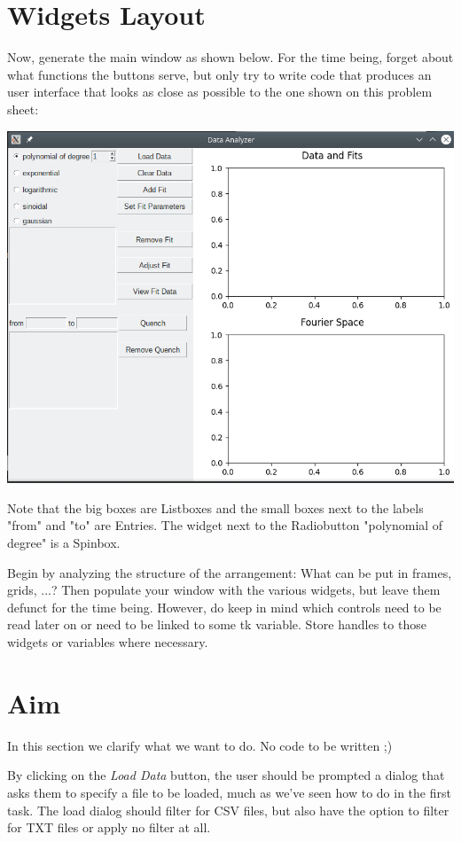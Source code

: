 \documentclass[
	english,
	fontsize=10pt,
	parskip=half,
	titlepage=true,
	DIV=12
]{scrartcl}
\begin{document}
\section{Widgets Layout}
Now, generate the main window as shown below. For the time being, forget about what functions the buttons serve, but only try to write code that produces an user interface that looks as close as possible to the one shown on this problem sheet:
\begin{center}
	\includegraphics[width=.8\linewidth]{./tk-MainWin}
\end{center}
Note that the big boxes are Listboxes and the small boxes next to the labels "from" and "to" are Entries. The widget next to the Radiobutton "polynomial of degree" is a Spinbox.

Begin by analyzing the structure of the arrangement: What can be put in frames, grids, ...? Then populate your window with the various widgets, but leave them defunct for the time being. However, do keep in mind which controls need to be read later on or need to be linked to some tk variable. Store handles to those widgets or variables where necessary.

\section{Aim}
In this section we clarify what we want to do. No code to be written ;)

By clicking on the \emph{Load Data} button, the user should be prompted a dialog that asks them to specify a file to be loaded, much as we've seen how to do in the first task. The load dialog should filter for CSV files, but also have the option to filter for TXT files or apply no filter at all.
\end{document}
